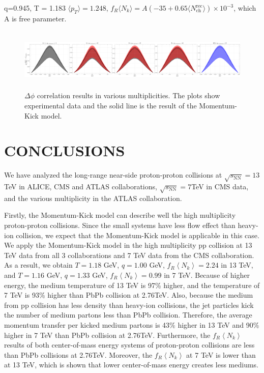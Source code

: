 \documentclass[jkps,fleqn,showpacs,showkeys]{revtex4}
\begin{document}
q=0.945, T = 1.183 $\langle p_T \rangle=1.248$, $f_R \langle N_k \rangle = A(-35+0.65\langle N_{\text{ch}}^{\text{rec}}\rangle)\times10^{-3}$, which A is free parameter.

\begin{figure}[ht]
  \centering
  \includegraphics[width=18cm, height=3cm]{./Figures/Prediction_pp14TeV.png}
  \caption{$\Delta \phi$ correlation results in various multiplicities.
  The plots show experimental data and the solid line is the result of the Momentum-Kick model.
  }
  \label{figure:pp14prediction}
\end{figure}



\section*{CONCLUSIONS}
\label{sec:Conclusion}


We have analyzed the long-range near-side proton-proton collisions at $\sqrt{s_\text{NN}}=13$TeV in ALICE, CMS and ATLAS collaborations\cite{alice, cms, atlas}, $\sqrt{s_\text{NN}}=7$TeV in CMS data\cite{cms}, and the various multiplicity in the ATLAS collaboration\cite{atlas}.

Firstly, the Momentum-Kick model can describe well the high multiplicity proton-proton collisions.
Since the small systems have less flow effect than heavy-ion collision, we expect that the Momentum-Kick model is applicable in this case.
We apply the Momentum-Kick model in the high multiplicity pp collision at 13 TeV data from all 3 collaborations and 7 TeV data from the CMS collaboration. 
As a result, we obtain $T=1.18$ GeV, $q=1.00$ GeV, $f_R\left\langle N_k \right\rangle = 2.24$ in 13 TeV, and $T=1.16$ GeV, $q=1.33$ GeV, $f_R\left\langle N_k \right\rangle = 0.99$ in 7 TeV.
Because of higher energy, the medium temperature of 13 TeV is 97\% higher, and the temperature of 7 TeV is 93\% higher than PbPb collision at 2.76TeV.
Also, because the medium from pp collision has less density than heavy-ion collisions, the jet particles kick the number of medium partons less than PbPb collision.
Therefore, the average momentum transfer per kicked medium partons is 43\% higher in 13 TeV and 90\% higher in 7 TeV than PbPb collision at 2.76TeV.
Furthermore, the $f_R\left\langle N_k \right\rangle$ results of both center-of-mass energy systems of proton-proton collisions are less than PbPb collisions at 2.76TeV.
Moreover, the $f_R\left\langle N_k \right\rangle$ at 7 TeV is lower than at 13 TeV, which is shown that lower center-of-mass energy creates less mediums.
\end{document}
